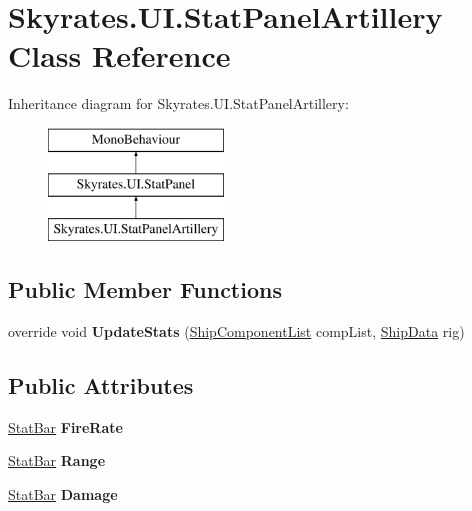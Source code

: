 \hypertarget{class_skyrates_1_1_u_i_1_1_stat_panel_artillery}{\section{Skyrates.\-U\-I.\-Stat\-Panel\-Artillery Class Reference}
\label{class_skyrates_1_1_u_i_1_1_stat_panel_artillery}
}
Inheritance diagram for Skyrates.\-U\-I.\-Stat\-Panel\-Artillery\-:\begin{figure}[H]
\begin{center}
\leavevmode
\includegraphics[height=3.000000cm]{class_skyrates_1_1_u_i_1_1_stat_panel_artillery}
\end{center}
\end{figure}
\subsection*{Public Member Functions}
\begin{DoxyCompactItemize}
\item 
\hypertarget{class_skyrates_1_1_u_i_1_1_stat_panel_artillery_a97490926aec88ad9830ed854d0525f20}{override void {\bfseries Update\-Stats} (\hyperlink{class_skyrates_1_1_ship_1_1_ship_component_list}{Ship\-Component\-List} comp\-List, \hyperlink{class_skyrates_1_1_ship_1_1_ship_data}{Ship\-Data} rig)}\label{class_skyrates_1_1_u_i_1_1_stat_panel_artillery_a97490926aec88ad9830ed854d0525f20}

\end{DoxyCompactItemize}
\subsection*{Public Attributes}
\begin{DoxyCompactItemize}
\item 
\hypertarget{class_skyrates_1_1_u_i_1_1_stat_panel_artillery_ac2c701a5e96f4ed322f6b2be1a19922a}{\hyperlink{class_skyrates_1_1_u_i_1_1_stat_bar}{Stat\-Bar} {\bfseries Fire\-Rate}}\label{class_skyrates_1_1_u_i_1_1_stat_panel_artillery_ac2c701a5e96f4ed322f6b2be1a19922a}

\item 
\hypertarget{class_skyrates_1_1_u_i_1_1_stat_panel_artillery_a4e1e2f7a49dd167d4a7f10ac1e1e05c7}{\hyperlink{class_skyrates_1_1_u_i_1_1_stat_bar}{Stat\-Bar} {\bfseries Range}}\label{class_skyrates_1_1_u_i_1_1_stat_panel_artillery_a4e1e2f7a49dd167d4a7f10ac1e1e05c7}

\item 
\hypertarget{class_skyrates_1_1_u_i_1_1_stat_panel_artillery_ae023a3995023f904b42ad4c30c92aec7}{\hyperlink{class_skyrates_1_1_u_i_1_1_stat_bar}{Stat\-Bar} {\bfseries Damage}}\label{class_skyrates_1_1_u_i_1_1_stat_panel_artillery_ae023a3995023f904b42ad4c30c92aec7}

\end{DoxyCompactItemize}
